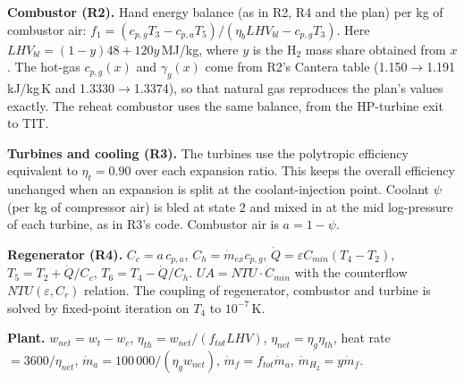 \documentclass[10.5pt,a4paper]{article}
\begin{document}
\textbf{Combustor (R2).} Hand energy balance (as in R2, R4 and the plan) per kg of combustor air: $f_1=(c_{p,g}T_3-c_{p,a}T_5)/(\eta_bLHV_{bl}-c_{p,g}T_3)$. Here $LHV_{bl}=(1-y)48+120y$\,MJ/kg, where $y$ is the H$_2$ mass share obtained from $x$. The hot-gas $c_{p,g}(x)$ and $\gamma_g(x)$ come from R2's Cantera table (1.150$\to$1.191\,kJ/kg\,K and 1.3330$\to$1.3374), so that natural gas reproduces the plan's values exactly. The reheat combustor uses the same balance, from the HP-turbine exit to TIT.

\textbf{Turbines and cooling (R3).} The turbines use the polytropic efficiency equivalent to $\eta_t=0.90$ over each expansion ratio. This keeps the overall efficiency unchanged when an expansion is split at the coolant-injection point. Coolant $\psi$ (per kg of compressor air) is bled at state 2 and mixed in at the mid log-pressure of each turbine, as in R3's code. Combustor air is $a=1-\psi$.

\textbf{Regenerator (R4).} $C_c=a\,c_{p,a}$, $C_h=\dot m_{ex}c_{p,g}$, $\dot Q=\varepsilon C_{min}(T_4-T_2)$, $T_5=T_2+\dot Q/C_c$, $T_6=T_4-\dot Q/C_h$. $UA=NTU\cdot C_{min}$ with the counterflow $NTU(\varepsilon,C_r)$ relation. The coupling of regenerator, combustor and turbine is solved by fixed-point iteration on $T_4$ to $10^{-7}$\,K.

\textbf{Plant.} $w_{net}=w_t-w_c$, $\eta_{th}=w_{net}/(f_{tot}LHV)$, $\eta_{net}=\eta_g\eta_{th}$, heat rate $=3600/\eta_{net}$, $\dot m_a=100\,000/(\eta_gw_{net})$, $\dot m_f=f_{tot}\dot m_a$, $\dot m_{H_2}=y\dot m_f$.
\end{document}
